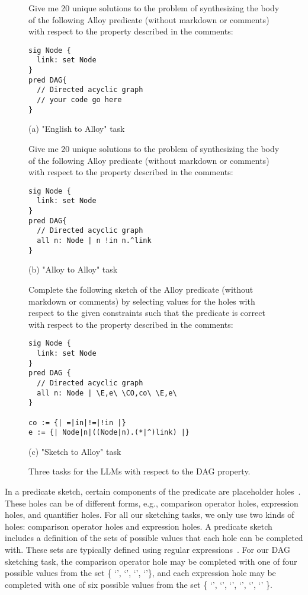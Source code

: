 \begin{figure}[!p]
\centering
\begin{tcolorbox}[mytextbox]
Give me 20 unique solutions to the problem of synthesizing the body of the following Alloy predicate (without markdown or comments) with respect to the property described in the comments:
\begin{lstlisting}
sig Node {
  link: set Node
}
pred DAG{
  // Directed acyclic graph
  // your code go here
}
\end{lstlisting}
\end{tcolorbox}
(a) "English to Alloy" task\\
\begin{tcolorbox}[mytextbox]
Give me 20 unique solutions to the problem of synthesizing the body of the following Alloy predicate (without markdown or comments) with respect to the property described in the comments:
\begin{lstlisting}
sig Node {
  link: set Node
}
pred DAG{
  // Directed acyclic graph
  all n: Node | n !in n.^link
}
\end{lstlisting}
\end{tcolorbox}
(b) "Alloy to Alloy" task\\
\begin{tcolorbox}[mytextbox]
Complete the following sketch of the Alloy predicate (without markdown or comments) by selecting values for the holes with respect to the given constraints such that the predicate is correct with respect to the property described in the comments:

\begin{lstlisting}
sig Node {
  link: set Node
}
pred DAG {
  // Directed acyclic graph
  all n: Node | \E,e\ \CO,co\ \E,e\
}

co := {| =|in|!=|!in |}
e := {| Node|n|((Node|n).(*|^)link) |}
\end{lstlisting}
\end{tcolorbox}
(c) "Sketch to Alloy" task
\caption{Three tasks for the LLMs with respect to the DAG property.}
\label{fig:three-tasks-for-DAG}
\end{figure}

In a predicate sketch, certain components of the predicate are placeholder holes~\cite{WangETALABZ2018ASketch}. These holes can be of different forms, e.g., comparison operator holes, expression holes, and quantifier holes.  For all our sketching tasks, we only use two kinds of holes: comparison operator holes and expression holes. A predicate sketch includes a definition of the sets of possible values that each hole can be completed with.  These sets are typically defined using regular expressions~\cite{SolarLazemaPhD2008}.  For our DAG sketching task, the comparison operator hole may be completed with one of four possible values from the set \{ `\CodeIn{=}', `', `\CodeIn{!=}', `'\}, and each expression hole may be completed with one of six possible values from the set \{ `', `', `', `', `', `' \}.


